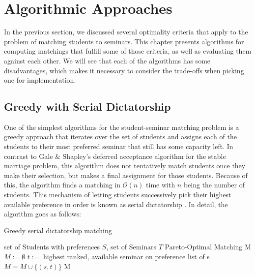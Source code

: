 \section{Algorithmic Approaches}\label{chapter:algorithms}
In the previous section, we discussed several optimality criteria that apply to the problem of matching students to seminars. This chapter presents algorithms for computing matchings that fulfill some of those criteria, as well as evaluating them against each other. We will see that each of the algorithms has some disadvantages, which makes it necessary to consider the trade-offs when picking one for implementation.

\subsection{Greedy with Serial Dictatorship}\label{algo-rsd}
One of the simplest algorithms for the student-seminar matching problem is a greedy approach that iterates over the set of students and assigns each of the students to their most preferred seminar that still has some capacity left. In contrast to Gale \& Shapley's deferred acceptance algorithm for the stable marriage problem, this algorithm does not tentatively match students once they make their selection, but makes a final assignment for those students. Because of this, the algorithm finds a matching in $\mathcal{O}(n)$ time with $n$ being the number of students. This mechanism of letting students successively pick their highest available preference in order is known as serial dictatorship \cite{MANEA2007316}. In detail, the algorithm goes as follows: 

\begin{algorithm} %
    \caption{Greedy serial dictatorship matching} 
    \label{alg1} %
    \begin{algorithmic} %
        \Require set of Students with preferences $S$, set of Seminars $T$
        \Ensure Pareto-Optimal Matching M
        \State $M := \emptyset$
            \State $t :=$ highest ranked, available seminar on preference list of s
                \State $M = M \cup \{(s, t)\}$
            \EndIf
        \EndFor
        \State\Return M
        \EndFunction
    \end{algorithmic}
\end{algorithm}


